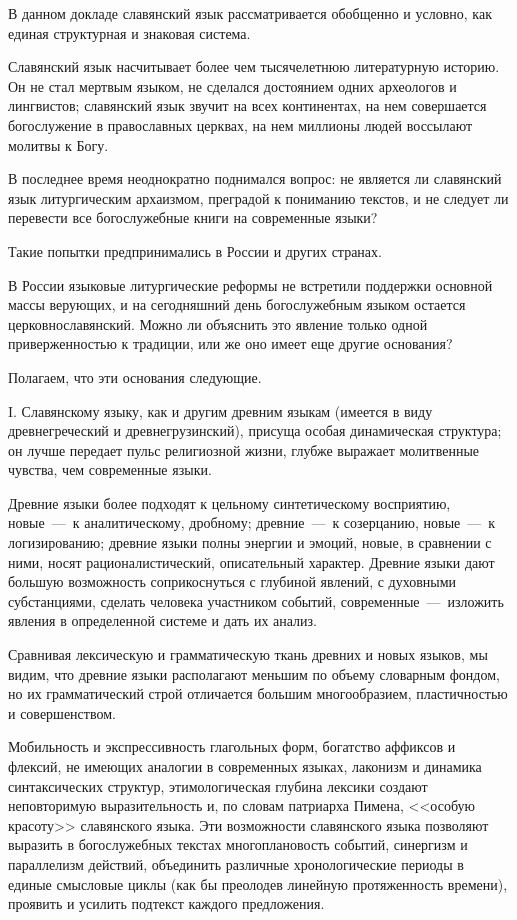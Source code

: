 \documentclass[11pt,a4paper]{memoir}
\begin{document}
    В данном докладе славянский язык рассматривается обобщенно и условно, как единая структурная и знаковая система.
    
    Славянский язык насчитывает более чем тысячелетнюю литературную историю. Он не стал мертвым языком, не сделался достоянием одних археологов и лингвистов; славянский язык звучит на всех континентах, на нем совершается богослужение в православных церквах, на нем миллионы людей воссылают молитвы к Богу.
    
    В последнее время неоднократно поднимался вопрос: не является ли славянский язык литургическим архаизмом, преградой к пониманию текстов, и не следует ли перевести все богослужебные книги на современные языки?
    
    Такие попытки предпринимались в России и других странах.
    
    В России языковые литургические реформы не встретили поддержки основной массы верующих, и на сегодняшний день богослужебным языком остается церковнославянский. Можно ли объяснить это явление только одной приверженностью к традиции, или же оно имеет еще другие основания?
    
    Полагаем, что эти основания следующие.
    
    I. Славянскому языку, как и другим древним языкам (имеется в виду древнегреческий и древнегрузинский), присуща особая динамическая структура; он лучше передает пульс религиозной жизни, глубже выражает молитвенные чувства, чем современные языки.
    
    Древние языки более подходят к цельному синтетическому восприятию, новые~---~к аналитическому, дробному; древние~---~к созерцанию, новые~---~к логизированию; древние языки полны энергии и эмоций, новые, в сравнении с ними, носят рационалистический, описательный характер. Древние языки дают большую возможность соприкоснуться с глубиной явлений, с духовными субстанциями, сделать человека участником событий, современные~---~изложить явления в определенной системе и дать их анализ.
    
    Сравнивая лексическую и грамматическую ткань древних и новых языков, мы видим, что древние языки располагают меньшим по объему словарным фондом, но их грамматический строй отличается большим многообразием, пластичностью и совершенством.
    
    Мобильность и экспрессивность глагольных форм, богатство аффиксов и флексий, не имеющих аналогии в современных языках, лаконизм и динамика синтаксических структур, этимологическая глубина лексики создают неповторимую выразительность и, по словам патриарха Пимена, <<особую красоту>> славянского языка. Эти возможности славянского языка позволяют выразить в богослужебных текстах многоплановость событий, синергизм и параллелизм действий, объединить различные хронологические периоды в единые смысловые циклы (как бы преолодев линейную протяженность времени), проявить и усилить подтекст каждого предложения.
    
\end{document}
